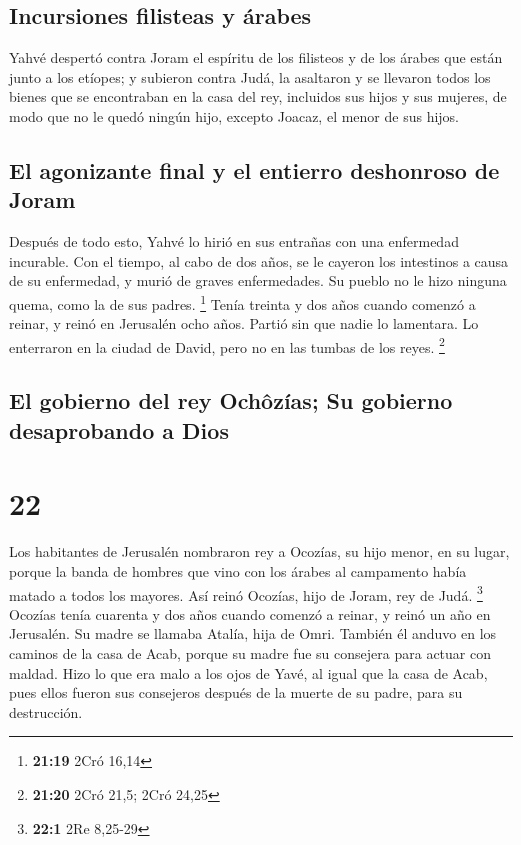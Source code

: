 \hypertarget{incursiones-filisteas-y-uxe1rabes}{%
\subsection{Incursiones filisteas y
árabes}\label{incursiones-filisteas-y-uxe1rabes}}

 Yahvé despertó contra Joram el espíritu de los filisteos
y de los árabes que están junto a los etíopes;  y
subieron contra Judá, la asaltaron y se llevaron todos los bienes que se
encontraban en la casa del rey, incluidos sus hijos y sus mujeres, de
modo que no le quedó ningún hijo, excepto Joacaz, el menor de sus hijos.

\hypertarget{el-agonizante-final-y-el-entierro-deshonroso-de-joram}{%
\subsection{El agonizante final y el entierro deshonroso de
Joram}\label{el-agonizante-final-y-el-entierro-deshonroso-de-joram}}

 Después de todo esto, Yahvé lo hirió en sus entrañas con
una enfermedad incurable.  Con el tiempo, al cabo de dos
años, se le cayeron los intestinos a causa de su enfermedad, y murió de
graves enfermedades. Su pueblo no le hizo ninguna quema, como la de sus
padres. \footnote{\textbf{21:19} 2Cró 16,14}  Tenía
treinta y dos años cuando comenzó a reinar, y reinó en Jerusalén ocho
años. Partió sin que nadie lo lamentara. Lo enterraron en la ciudad de
David, pero no en las tumbas de los reyes. \footnote{\textbf{21:20} 2Cró
  21,5; 2Cró 24,25}

\hypertarget{el-gobierno-del-rey-ochuxf4zuxedas-su-gobierno-desaprobando-a-dios}{%
\subsection{El gobierno del rey Ochôzías; Su gobierno desaprobando a
Dios}\label{el-gobierno-del-rey-ochuxf4zuxedas-su-gobierno-desaprobando-a-dios}}

\hypertarget{section-21}{%
\section{22}\label{section-21}}

 Los habitantes de Jerusalén nombraron rey a Ocozías, su
hijo menor, en su lugar, porque la banda de hombres que vino con los
árabes al campamento había matado a todos los mayores. Así reinó
Ocozías, hijo de Joram, rey de Judá. \footnote{\textbf{22:1} 2Re 8,25-29}
 Ocozías tenía cuarenta y dos años cuando comenzó a
reinar, y reinó un año en Jerusalén. Su madre se llamaba Atalía, hija de
Omri.  También él anduvo en los caminos de la casa de
Acab, porque su madre fue su consejera para actuar con maldad.
 Hizo lo que era malo a los ojos de Yavé, al igual que la
casa de Acab, pues ellos fueron sus consejeros después de la muerte de
su padre, para su destrucción.


